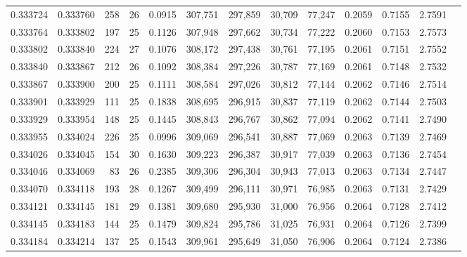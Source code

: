 \begin{tabular}{rrrrrrrrrrrrr}
0.333724 & 0.333760 &   258 &  26 &                                     0.0915 & 307,751 & 297,859 &  30,709 &  77,247 & 0.2059 & 0.7155 & 2.7591 \\
0.333764 & 0.333802 &   197 &  25 &                                     0.1126 & 307,948 & 297,662 &  30,734 &  77,222 & 0.2060 & 0.7153 & 2.7573 \\
0.333802 & 0.333840 &   224 &  27 &                                     0.1076 & 308,172 & 297,438 &  30,761 &  77,195 & 0.2061 & 0.7151 & 2.7552 \\
0.333840 & 0.333867 &   212 &  26 &                                     0.1092 & 308,384 & 297,226 &  30,787 &  77,169 & 0.2061 & 0.7148 & 2.7532 \\
0.333867 & 0.333900 &   200 &  25 &                                     0.1111 & 308,584 & 297,026 &  30,812 &  77,144 & 0.2062 & 0.7146 & 2.7514 \\
0.333901 & 0.333929 &   111 &  25 &                                     0.1838 & 308,695 & 296,915 &  30,837 &  77,119 & 0.2062 & 0.7144 & 2.7503 \\
0.333929 & 0.333954 &   148 &  25 &                                     0.1445 & 308,843 & 296,767 &  30,862 &  77,094 & 0.2062 & 0.7141 & 2.7490 \\
0.333955 & 0.334024 &   226 &  25 &                                     0.0996 & 309,069 & 296,541 &  30,887 &  77,069 & 0.2063 & 0.7139 & 2.7469 \\
0.334026 & 0.334045 &   154 &  30 &                                     0.1630 & 309,223 & 296,387 &  30,917 &  77,039 & 0.2063 & 0.7136 & 2.7454 \\
0.334046 & 0.334069 &    83 &  26 &                                     0.2385 & 309,306 & 296,304 &  30,943 &  77,013 & 0.2063 & 0.7134 & 2.7447 \\
0.334070 & 0.334118 &   193 &  28 &                                     0.1267 & 309,499 & 296,111 &  30,971 &  76,985 & 0.2063 & 0.7131 & 2.7429 \\
0.334121 & 0.334145 &   181 &  29 &                                     0.1381 & 309,680 & 295,930 &  31,000 &  76,956 & 0.2064 & 0.7128 & 2.7412 \\
0.334145 & 0.334183 &   144 &  25 &                                     0.1479 & 309,824 & 295,786 &  31,025 &  76,931 & 0.2064 & 0.7126 & 2.7399 \\
0.334184 & 0.334214 &   137 &  25 &                                     0.1543 & 309,961 & 295,649 &  31,050 &  76,906 & 0.2064 & 0.7124 & 2.7386 \\

\end{tabular}
